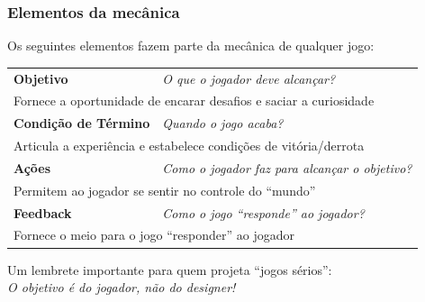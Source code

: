 \expandafter\documentclass\expandafter[table, usenames, svgnames, dvipsnames, \classopts]{beamer}
\begin{document}
\begin{frame}
	\frametitle{\textbf{Elementos da mecânica}}

	Os seguintes elementos fazem parte da mecânica de qualquer jogo:
	
	\begin{table}
		\scriptsize
		\setlength{\tabcolsep}{5pt}
		\renewcommand{\arraystretch}{1}
		\begin{tabular}{ll}
			\toprule
			\textbf{Objetivo} & \textit{O que o jogador deve alcançar?}\\
			\multicolumn{2}{l}{\hspace{1em} Fornece a oportunidade de encarar desafios e saciar a curiosidade}\\[1em]
			\textbf{Condição de Término} & \textit{Quando o jogo acaba?}\\
			\multicolumn{2}{l}{\hspace{1em} Articula a experiência e estabelece condições de vitória/derrota}\\[1em]
			\textbf{Ações} & \textit{Como o jogador faz para alcançar o objetivo?}\\
			\multicolumn{2}{l}{\hspace{1em} Permitem ao jogador se sentir no controle do ``mundo''}\\[1em]
			\textbf{Feedback} & \textit{Como o jogo ``responde'' ao jogador?}\\
			\multicolumn{2}{l}{\hspace{1em} Fornece o meio para o jogo ``responder'' ao jogador}\\
			\bottomrule
		\end{tabular}
	\end{table}	

	\vspace{-0.5em}

	\begin{block}{}
	
		\vspace{1em}
	
		\begin{center}
			{\large
				Um lembrete importante para quem projeta ``jogos sérios'':\\[1em]
				\emph{O objetivo é do jogador, não do designer!}
			}
		\end{center}

		\vspace{0.2em}

	\end{block}
	
\end{frame}
\end{document}
